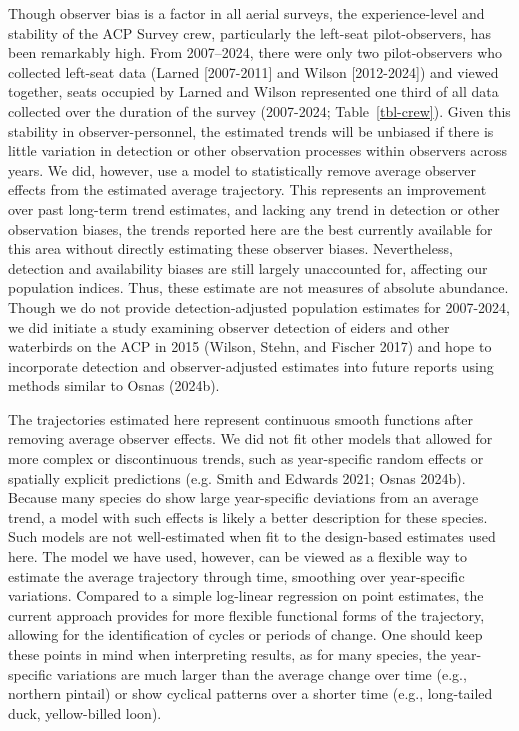 \documentclass[
]{article}
\begin{document}
Though observer bias is a factor in all aerial surveys, the
experience-level and stability of the ACP Survey crew, particularly the
left-seat pilot-observers, has been remarkably high. From 2007--2024,
there were only two pilot-observers who collected left-seat data (Larned
{[}2007-2011{]} and Wilson {[}2012-2024{]}) and viewed together, seats
occupied by Larned and Wilson represented one third of all data
collected over the duration of the survey (2007-2024;
Table~\ref{tbl-crew}). Given this stability in observer-personnel, the
estimated trends will be unbiased if there is little variation in
detection or other observation processes within observers across years.
We did, however, use a model to statistically remove average observer
effects from the estimated average trajectory. This represents an
improvement over past long-term trend estimates, and lacking any trend
in detection or other observation biases, the trends reported here are
the best currently available for this area without directly estimating
these observer biases. Nevertheless, detection and availability biases
are still largely unaccounted for, affecting our population indices.
Thus, these estimate are not measures of absolute abundance. Though we
do not provide detection-adjusted population estimates for 2007-2024, we
did initiate a study examining observer detection of eiders and other
waterbirds on the ACP in 2015 (Wilson, Stehn, and Fischer 2017) and hope
to incorporate detection and observer-adjusted estimates into future
reports using methods similar to Osnas (2024b).

The trajectories estimated here represent continuous smooth functions
after removing average observer effects. We did not fit other models
that allowed for more complex or discontinuous trends, such as
year-specific random effects or spatially explicit predictions (e.g.
Smith and Edwards 2021; Osnas 2024b). Because many species do show large
year-specific deviations from an average trend, a model with such
effects is likely a better description for these species. Such models
are not well-estimated when fit to the design-based estimates used here.
The model we have used, however, can be viewed as a flexible way to
estimate the average trajectory through time, smoothing over
year-specific variations. Compared to a simple log-linear regression on
point estimates, the current approach provides for more flexible
functional forms of the trajectory, allowing for the identification of
cycles or periods of change. One should keep these points in mind when
interpreting results, as for many species, the year-specific variations
are much larger than the average change over time (e.g., northern
pintail) or show cyclical patterns over a shorter time (e.g.,
long-tailed duck, yellow-billed loon).
\end{document}
